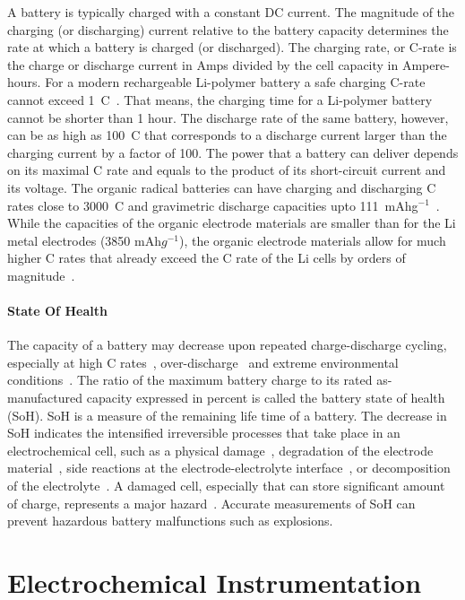 A battery is typically charged with a constant DC current. The magnitude of the charging (or discharging) current relative to the battery capacity determines the rate at which a battery is charged (or discharged). The charging rate, or C-rate is the charge or discharge current in Amps divided by the cell capacity in Ampere-hours. For a modern rechargeable Li-polymer battery a safe charging C-rate cannot exceed 1~C~\cite{Zhang2022}. That means, the charging time for a Li-polymer battery cannot be shorter than 1 hour. The discharge rate of the same battery, however, can be as high as 100~C that corresponds to a discharge current larger than the charging current by a factor of 100. The power that a battery can deliver depends on its maximal C rate and equals to the product of its short-circuit current and its voltage. The organic radical batteries can have charging and discharging C rates close to 3000~C and gravimetric discharge capacities upto 111~mAhg$^{-1}$~\cite{Vereshchagin2020,friebe2017_topcurrchem,Zens2022,Vereshchagin2022,Kulikov2023,Tarascon2001}. While the capacities of the organic electrode materials are smaller than for the Li metal electrodes (3850 mAh$g^{-1}$), the organic electrode materials allow for much higher C rates that already exceed the C rate of the Li cells by orders of magnitude~\cite{C_rates_of_lipos}.

\paragraph{State Of Health}
The capacity of a battery may decrease upon repeated charge-discharge cycling, especially at high C rates~\cite{Guan2018,Ouyang2020}, over-discharge~\cite{Ma2020} and extreme environmental conditions~\cite{Zhang2022}. The ratio of the maximum battery charge to its rated as-manufactured capacity expressed in percent is called the battery state of health (SoH). SoH is a measure of the remaining life time of a battery. The decrease in SoH indicates the intensified irreversible processes that take place in an electrochemical cell, such as a physical damage~\cite{Fu_2015}, degradation of the electrode material~\cite{Ma2020,Kulikov2022}, side reactions at the electrode-electrolyte interface~\cite{Tarascon2001}, or decomposition of the electrolyte~\cite{Fang_2021}. A damaged cell, especially that can store significant amount of charge, represents a major hazard~\cite{Ma2020}. Accurate measurements of SoH can prevent hazardous battery malfunctions such as explosions.

\section{Electrochemical Instrumentation}
